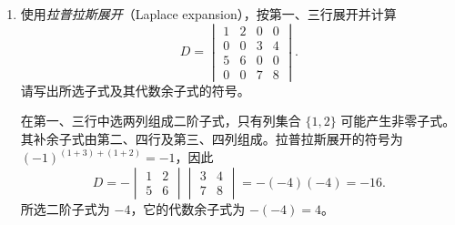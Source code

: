 \documentclass[UTF8,12pt,a4paper,fontset=fandol]{ctexart}
\begin{document}
\begin{enumerate}[label=\arabic*.,resume=detquestions]
\item\label{q:laplace}
使用\emph{拉普拉斯展开}（Laplace expansion），按第一、三行展开并计算
\[
D=\begin{vmatrix}
1&2&0&0\\0&0&3&4\\5&6&0&0\\0&0&7&8
\end{vmatrix}.
\]
请写出所选子式及其代数余子式的符号。
\begin{solve}
在第一、三行中选两列组成二阶子式，只有列集合 $\{1,2\}$ 可能产生非零子式。
其补余子式由第二、四行及第三、四列组成。拉普拉斯展开的符号为
$(-1)^{(1+3)+(1+2)}=-1$，因此
\[
D=-\begin{vmatrix}1&2\\5&6\end{vmatrix}
\begin{vmatrix}3&4\\7&8\end{vmatrix}
=-(-4)(-4)=-16.
\]
所选二阶子式为 $-4$，它的代数余子式为 $-(-4)=4$。
\end{solve}
\end{enumerate}
\end{document}
